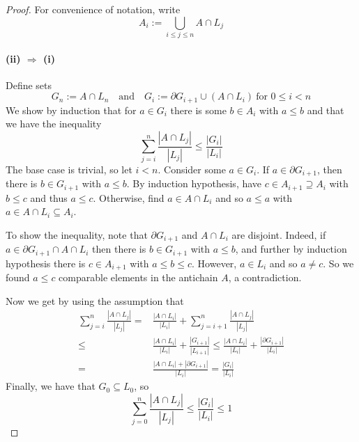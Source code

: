 \documentclass{scrartcl}
\theoremstyle{definition}
\begin{document}
\begin{proof}
    For convenience of notation, write
    \begin{equation*}
        A_i := \bigcup_{i \leq j \leq n} A \cap L_j
    \end{equation*}

    \paragraph{(ii) $\Rightarrow$ (i)} Define sets
    \begin{equation*}
        G_n := A \cap L_n \quad \text{and} \quad G_i := \partial G_{i + 1} \cup (A \cap L_i) \ \text{for $0 \leq i < n$}
    \end{equation*}
    We show by induction that for $a \in G_i$ there is some $b \in A_i$ with $a \leq b$ and that we have the inequality
    \begin{equation*}
        \sum_{j = i}^n \frac {|A \cap L_j|} {|L_j|} \leq \frac {|G_i|} {|L_i|}
    \end{equation*}
    The base case is trivial, so let $i < n$.
    Consider some $a \in G_i$.
    If $a \in \partial G_{i + 1}$, then there is $b \in G_{i + 1}$ with $a \leq b$.
    By induction hypothesis, have $c \in A_{i + 1} \supseteq A_i$ with $b \leq c$ and thus $a \leq c$.
    Otherwise, find $a \in A \cap L_i$ and so $a \leq a$ with $a \in A \cap L_i \subseteq A_i$.

    To show the inequality, note that $\partial G_{i + 1}$ and $A \cap L_i$ are disjoint.
    Indeed, if $a \in \partial G_{i + 1} \cap A \cap L_i$ then there is $b \in G_{i + 1}$ with $a \leq b$, and further by induction hypothesis there is $c \in A_{i + 1}$ with $a \leq b \leq c$.
    However, $a \in L_i$ and so $a \neq c$.
    So we found $a \leq c$ comparable elements in the antichain $A$, a contradiction.

    Now we get by using the assumption that
    \begin{align*}
        \sum_{j = i}^n \frac {|A \cap L_j|} {|L_j|} =& \frac {|A \cap L_i|} {|L_i|} + \sum_{j = i + 1}^n \frac {|A \cap L_j|} {|L_j|} \\
        \leq& \frac {|A \cap L_i|} {|L_i|} + \frac {|G_{i + 1}|} {|L_{i + 1}|} \leq \frac {|A \cap L_i|} {|L_i|} + \frac {|\partial G_{i + 1}|} {|L_i|} \\
        =& \frac {|A \cap L_i| + |\partial G_{i + 1}|} {|L_i|} = \frac {|G_i|} {|L_i|}
    \end{align*}
    Finally, we have that $G_0 \subseteq L_0$, so
    \begin{equation*}
        \sum_{j = 0}^n \frac {|A \cap L_j|} {|L_j|} \leq \frac {|G_i|} {|L_i|} \leq 1
    \end{equation*}


\end{proof}
\end{document}
